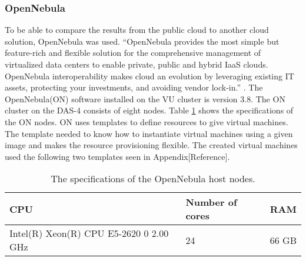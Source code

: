 \subsubsection{OpenNebula}
\label{hw:opennebula}
To be able to compare the results from the public cloud to another cloud solution, OpenNebula was used. 
``OpenNebula  provides the most simple but feature-rich and flexible solution for the comprehensive management of virtualized data centers to enable private, public and hybrid IaaS clouds. OpenNebula interoperability makes cloud an evolution by leveraging existing IT assets, protecting your investments, and avoiding vendor lock-in.'' \cite{opennebula}. The OpenNebula(ON) software installed on the VU cluster is version 3.8. The ON cluster on the DAS-4 consists of eight nodes. Table \ref{tab:specs-opennebula} shows the specifications of the ON nodes. ON uses templates to define resources to give virtual machines.  The template needed to know how to instantiate virtual machines using a given image and makes the resource provisioning flexible. The created virtual machines used the following two templates seen in Appendix[Reference].
\begin{table} [!h]
	\begin{center}
	\begin{tabular}{|l|l|l|}
		\hline
		CPU & Number of cores & RAM  \\ \hline
		Intel(R) Xeon(R) CPU E5-2620 0 2.00 GHz & 24 & 66 GB\\ \hline
	\end{tabular}
	\caption{The specifications of the OpenNebula host nodes.}
	\label{tab:specs-opennebula}
	\end{center}
\end{table}


